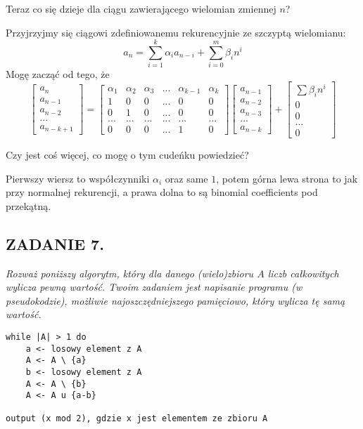 \documentclass{article}
\begin{document}
Teraz co się dzieje dla ciągu zawierającego wielomian zmiennej $n$?

Przyjrzyjmy się ciągowi zdefiniowanemu rekurencyjnie ze szczyptą wielomianu:
$$a_n=\sum\limits_{i=1}^k\alpha_ia_{n-i}+\sum\limits_{i=0}^m\beta_in^i$$
Mogę zacząć od tego, że
$$\begin{bmatrix}
    a_n\\a_{n-1}\\a_{n-2}\\...\\a_{n-k+1}
\end{bmatrix}=\begin{bmatrix}
    \alpha_1 & \alpha_2 & \alpha_3 & ... &\alpha_{k-1} & \alpha_k\\
    1 & 0 & 0 & ... & 0 & 0\\
    0 & 1 & 0 & ... & 0 & 0\\
    ... & ... & ... & ... & ... & ...\\
    0 & 0 & 0 & ... & 1 & 0
\end{bmatrix}\begin{bmatrix}
    a_{n-1}\\a_{n-2}\\a_{n-3}\\...\\a_{n-k}
\end{bmatrix}+\begin{bmatrix}
    \sum\beta_in^i\\0\\0\\...\\0
\end{bmatrix}$$

{\color{orange}Czy jest coś więcej, co mogę o tym cudeńku powiedzieć?}

Pierwszy wiersz to współczynniki $\alpha_i$ oraz same $1$, potem górna lewa strona to jak przy normalnej rekurencji, a prawa dolna to są binomial coefficients pod przekątną.

\subsection*{ZADANIE 7.}
\emph{Rozważ poniższy algorytm, który dla danego (wielo)zbioru $A$ liczb całkowitych wylicza pewną wartość. Twoim zadaniem jest napisanie programu (w pseudokodzie), możliwie najoszczędniejszego pamięciowo, który wylicza tę samą wartość.}

\begin{lstlisting}
while |A| > 1 do
    a <- losowy element z A
    A <- A \ {a}
    b <- losowy element z A
    A <- A \ {b}
    A <- A u {a-b}

output (x mod 2), gdzie x jest elementem ze zbioru A
\end{lstlisting}
\smallskip
\end{document}
